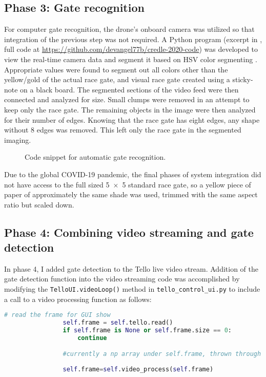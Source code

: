 \subsection{Phase 3: Gate recognition}
For computer gate recognition, the drone's onboard camera was utilized so that integration of the previous step was not required. A Python program (excerpt in , full code at \url{https://github.com/devangel77b/credle-2020-code}) was developed to view the real-time camera data and segment it based on HSV color segmenting \cite{bradski2008learning}. Appropriate values were found to segment out all colors other than the yellow/gold of the actual race gate, and visual race gate created using a sticky-note on a black board. The segmented sections of the video feed were then connected and analyzed for size. Small clumps were removed in an attempt to keep only the race gate. The remaining objects in the image were then analyzed for their number of edges. Knowing that the race gate has eight edges, any shape without 8 edges was removed. This left only the race gate in the segmented imaging.
\begin{figure}
\caption{Code snippet for automatic gate recognition.}
\label{fig:pseudocode3}

\end{figure}

Due to the global COVID-19 pandemic, the final phases of system integration did not have access to the full sized \SI{5x5}{\foot} standard race gate, so a yellow piece of paper of approximately the same shade was used, trimmed with the same aspect ratio but scaled down. 





\subsection{Phase 4: Combining video streaming and gate detection}
In phase 4, I added gate detection to the Tello live video stream.  Addition of the gate detection function into the video streaming code was accomplished by modifying the \lstinline{TelloUI.videoLoop()} method in \lstinline{tello_control_ui.py} to include a call to a video processing function as follows:
\begin{lstlisting}[language=python]
            # read the frame for GUI show
                self.frame = self.tello.read()
                if self.frame is None or self.frame.size == 0:
                    continue 

            	#currently a np array under self.frame, thrown through processing after being pulled but before being put into the gui
		
                self.frame=self.video_process(self.frame)
\end{lstlisting}

